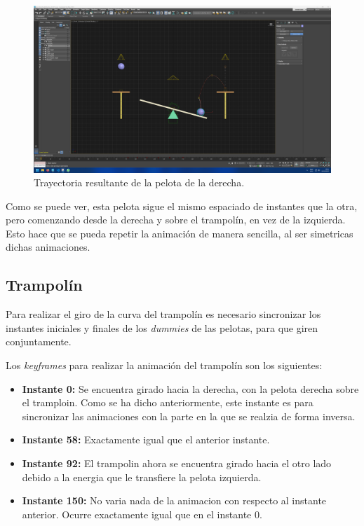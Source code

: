 \documentclass{article}
\begin{document}
\begin{figure}[H]
    \centering
    \includegraphics[width=\textwidth]{imagenes/animaciones/PR/pelota/motionpath.png}
    \caption{Trayectoria resultante de la pelota de la derecha.}
 \end{figure}
 
Como se puede ver, esta pelota sigue el mismo espaciado de instantes que la otra, pero comenzando desde la derecha y sobre el trampolín, en vez de la izquierda. Esto hace que se pueda repetir la animación de manera sencilla, al ser simetricas dichas animaciones.
\subsection{Trampolín}
Para realizar el giro de la curva del trampolín es necesario sincronizar los instantes iniciales y finales de los \textit{dummies} de las pelotas, para que giren conjuntamente.

\bigskip

Los \textit{keyframes} para realizar la animación del trampolín son los siguientes:

\begin{itemize}
    \item \textbf{Instante 0: }Se encuentra girado hacia la derecha, con la pelota derecha sobre el tramploin. Como se ha dicho anteriormente, este instante es para sincronizar las animaciones con la parte en la que se realzia de forma inversa.
    \item \textbf{Instante 58: }Exactamente igual que el anterior instante.
    \item \textbf{Instante 92: }El trampolin ahora se encuentra girado hacia el otro lado debido a la energia que le transfiere la pelota izquierda.
    \item \textbf{Instante 150: }No varia nada de la animacion con respecto al instante anterior. Ocurre exactamente igual que en el instante 0.
\end{itemize}
\end{document}
